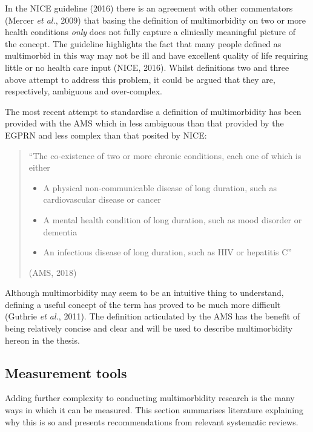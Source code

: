 \documentclass[12pt,a4paper,oneside,table]{report}
\begin{document}
In the NICE guideline (2016) there is an agreement with other
commentators (Mercer \emph{et al.}, 2009) that basing the definition of
multimorbidity on two or more health conditions \textit{only} does not
fully capture a clinically meaningful picture of the concept. The
guideline highlights the fact that many people defined as multimorbid in
this way may not be ill and have excellent quality of life requiring
little or no health care input (NICE, 2016). Whilst definitions two and
three above attempt to address this problem, it could be argued that
they are, respectively, ambiguous and over-complex.

The most recent attempt to standardise a definition of multimorbidity
has been provided with the AMS which in less ambiguous than that
provided by the EGPRN and less complex than that posited by NICE:

\begin{quotation} ``The co-existence of two or more chronic conditions, each one of which is either \begin{itemize}[noitemsep] \item A physical non-communicable disease of long duration, such as cardiovascular disease or cancer \item A mental health condition of long duration, such as mood disorder or dementia \item An infectious disease of long duration, such as HIV or hepatitis C'' \end{itemize} \hfill (AMS, 2018) \end{quotation}

Although multimorbidity may seem to be an intuitive thing to understand,
defining a useful concept of the term has proved to be much more
difficult (Guthrie \emph{et al.}, 2011). The definition articulated by
the AMS has the benefit of being relatively concise and clear and will
be used to describe multimorbidity hereon in the thesis.

\subsection{Measurement tools}\label{subsec:mm-measures}

Adding further complexity to conducting multimorbidity research is the
many ways in which it can be measured. This section summarises
literature explaining why this is so and presents recommendations from
relevant systematic reviews.
\end{document}
